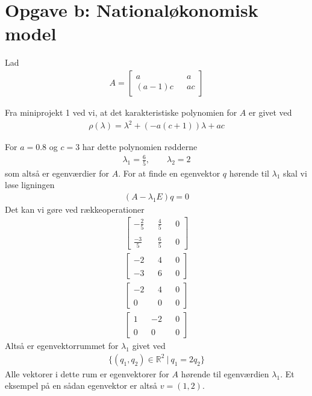\documentclass[12pt]{article}
\begin{document}
\section{Opgave b: Nationaløkonomisk model}

Lad
\begin{align}
A = \begin{bmatrix}
a  && a\\
(a-1)c && ac
\end{bmatrix}
\end{align}

Fra miniprojekt 1 ved vi, at det karakteristiske polynomien for $A$ er givet ved
\begin{align}
\rho(\lambda) = \lambda^2 + (-a(c+1))\lambda + ac
\end{align}

For $a=0.8$ og $c=3$ har dette polynomien rødderne
\begin{align}
\lambda_1=\frac{6}{5},\qquad \lambda_2 = 2
\end{align}
som altså er egenværdier for $A$. For at finde en egenvektor $q$ hørende til $\lambda_1$ skal vi løse ligningen
\begin{align}
(A-\lambda_1 E)q = 0
\end{align}
Det kan vi gøre ved rækkeoperationer
\begin{align}
\begin{bmatrix}
-\frac{2}{5} && \frac{4}{5} && 0\\
\\
\frac{-3}{5} && \frac{6}{5} && 0
\end{bmatrix}
\\
\begin{bmatrix}
-2 && 4 && 0\\
\\
-3 && 6 && 0
\end{bmatrix}
\\
\begin{bmatrix}
-2 && 4 && 0\\
\\
0 && 0 && 0
\end{bmatrix}
\\
\begin{bmatrix}
1 && -2 && 0\\
\\
0 && 0 && 0
\end{bmatrix}
\end{align}
Altså er egenvektorrummet for $\lambda_1$ givet ved
\begin{align}
\{(q_1, q_2)\in \mathbb{R}^2\ |\ q_1 = 2q_2 \}
\end{align}
Alle vektorer i dette rum er egenvektorer for $A$ hørende til egenværdien $\lambda_1$. Et eksempel på en sådan egenvektor er altså $v = (1, 2)$.
\end{document}

